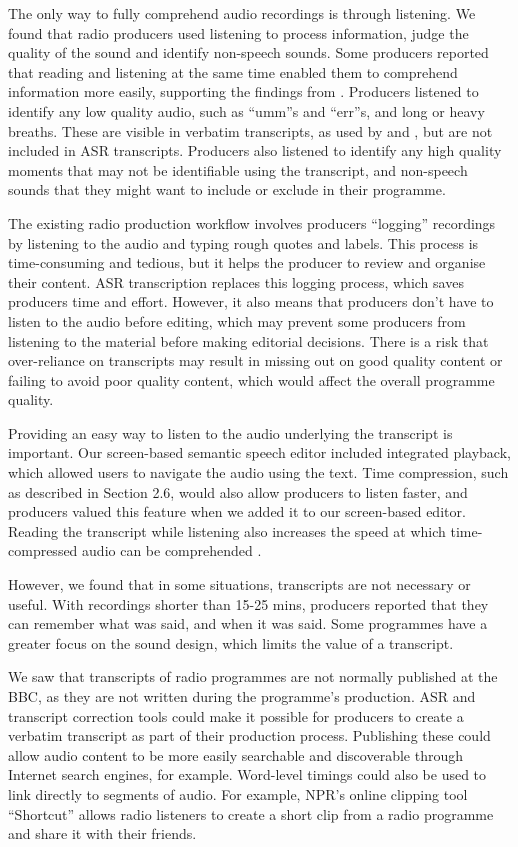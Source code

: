 The only way to fully comprehend audio recordings is through listening.  We found that radio producers used listening
to process information, judge the quality of the sound and identify non-speech sounds.  Some producers reported that
reading and listening at the same time enabled them to comprehend information more easily, supporting the findings from
\citet{Vemuri2004}.  Producers listened to identify any low quality audio, such as ``umm''s and ``err''s, and long or heavy
breaths. These are visible in verbatim transcripts, as used by \citet{Berthouzoz2012} and \citet{Rubin2013}, but are
not included in ASR transcripts.  Producers also listened to identify any high quality moments that may not be
identifiable using the transcript, and non-speech sounds that they might want to include or exclude in their programme.


The existing radio production workflow involves producers ``logging'' recordings by listening to the audio and typing
rough quotes and labels.  This process is time-consuming and tedious, but it helps the producer to review and organise
their content.  ASR transcription replaces this logging process, which saves producers time and effort. However, it
also means that producers don't have to listen to the audio before editing, which may prevent some producers from
listening to the material before making editorial decisions.  There is a risk that over-reliance on transcripts may
result in missing out on good quality content or failing to avoid poor quality content, which would affect the overall
programme quality.


Providing an easy way to listen to the audio underlying the transcript is important. Our screen-based semantic speech
editor included integrated playback, which allowed users to navigate the audio using the text.  Time compression, such
as described in Section 2.6, would also allow producers to listen faster, and producers valued this feature when we
added it to our screen-based editor. Reading the transcript while listening also increases the
speed at which time-compressed audio can be comprehended \citep{Vemuri2004}.

However, we found that in some situations, transcripts are not necessary or useful. With recordings shorter than 15-25
mins, producers reported that they can remember what was said, and when it was said. Some programmes have a greater
focus on the sound design, which limits the value of a transcript.



We saw that transcripts of radio programmes are not normally published at the BBC, as they are not written during the
programme's production. ASR and transcript correction tools could make it possible for producers to create a verbatim
transcript as part of their production process.  Publishing these could allow audio content to be more easily
searchable and discoverable through Internet search engines, for example.  Word-level timings could also be used to
link directly to segments of audio. For example, NPR's online clipping tool ``Shortcut'' \citep{Friedhoff2016} allows
radio listeners to create a short clip from a radio programme and share it with their friends. 

